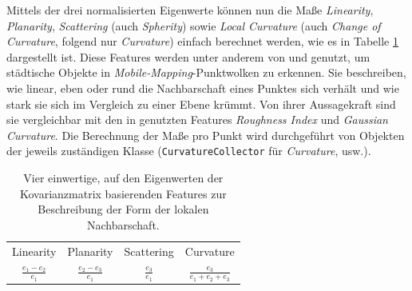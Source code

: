 Mittels der drei normalisierten Eigenwerte können nun die Maße \textit{Linearity}, \textit{Planarity}, \textit{Scattering} (auch \textit{Spherity}) sowie \textit{Local Curvature} (auch \textit{Change of Curvature}, folgend nur \textit{Curvature}) einfach berechnet werden, wie es in Tabelle \ref{table:eigenvalue_features} dargestellt ist. Diese Features werden unter anderem von \cite{Zaboli.etal-2019} und \cite{Li.Cheng-2018} genutzt, um städtische Objekte in \textit{Mobile-Mapping}-Punktwolken zu erkennen. Sie beschreiben, wie linear, eben oder rund die Nachbarschaft eines Punktes sich verhält und wie stark sie sich im Vergleich zu einer Ebene krümmt. Von ihrer Aussagekraft sind sie vergleichbar mit den in \cite{Zhiqiang.etal-2019} genutzten Features \textit{Roughness Index} und \textit{Gaussian Curvature}. Die Berechnung der Maße pro Punkt wird durchgeführt von Objekten der jeweils zuständigen Klasse (\texttt{CurvatureCollector} für \textit{Curvature}, usw.). \\

\begin{table}
\centering
\begin{tabular}{c|c|c|c}
Linearity & Planarity & Scattering & Curvature \\ 
$\frac{e_1 - e_2}{e_1}$ & $\frac{e_2 - e_3}{e_1}$ & $\frac{e_3}{e_1}$ & $\frac{e_3}{e_1 + e_2 + e_3}$ \\
\end{tabular}
\caption{Vier einwertige, auf den Eigenwerten der Kovarianzmatrix basierenden Features zur Beschreibung der Form der lokalen Nachbarschaft.}
\label{table:eigenvalue_features}
\end{table}

